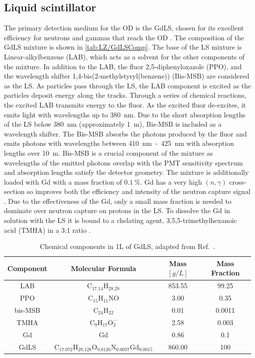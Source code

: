 \subsection{Liquid scintillator}\label{sec:LZ/LS}
The primary detection medium for the OD is the GdLS, chosen for its excellent efficiency for neutrons and gammas that reach the OD \cite{LZTDR}. The composition of the GdLS mixture is shown in \autoref{tab:LZ/GdLSComp}. The base of the LS mixture is Linear-alkylbenzene (LAB), which acts as a solvent for the other components of the mixture. In addition to the LAB, the fluor 2,5-diphenyloxazole (PPO), and the wavelength shifter 1,4-bis(2-methylstyryl(benzene)) (Bis-MSB) are considered as the LS. As particles pass through the LS, the LAB component is excited as the particles deposit energy along the tracks. Through a series of chemical reactions, the excited LAB transmits energy to the fluor. As the excited fluor de-excites, it emits light with wavelengths up to 380~nm. Due to the short absorption lengths of the LS below 380~nm (approximately 1~m), Bis-MSB is included as a wavelength shifter. The Bis-MSB absorbs the photons produced by the fluor and emits photons with wavelengths between 410~nm~-~425~nm with absorption lengths over 10~m. Bis-MSB is a crucial component of the mixture as wavelengths of the emitted photons overlap with the PMT sensitivity spectrum and absorption lengths satisfy the detector geometry.
The mixture is additionally loaded with Gd with a mass fraction of $0.1~\%$. Gd has a very high $(n,\gamma)$ cross-section so improves both the efficiency and intensity of the neutron capture signal \cite{LZTDR}. Due to the effectiveness of the Gd, only a small mass fraction is needed to dominate over neutron capture on protons in the LS. To dissolve the Gd in solution with the LS it is bound to a chelating agent, 3,5,5-trimethylhexanoic acid (TMHA) in a 3:1 ratio \cite{LZTDR,Haselschwardt:2018vmp}.
\begin{table}[!ht]
    \centering
    \begin{tabular}{cccc}
        \hline
        \textbf{Component} & \textbf{Molecular Formula} & \textbf{Mass $[g/L]$} & \textbf{Mass Fraction} \\
        \hline
        LAB & $\text{C}_{17.14}\text{H}_{28.28}$ & 853.55 & 99.25\\
        PPO & $\text{C}_{15}\text{H}_{11}\text{NO}$ & 3.00 & 0.35 \\
        bis-MSB & $\text{C}_{24}\text{H}_{22}$ & 0.01 & 0.0011\\
        TMHA & $\text{C}_{9}\text{H}_{17}\text{O}_{2}^{-}$ & 2.58 & 0.003\\
        Gd & Gd & 0.86 & 0.1 \\
        \hline
        GdLS & $\text{C}_{17.072} \text{H}_{28.128} \text{O}_{0.0126} \text{N}_{0.0037} \text{Gd}_{0.0015}$ & 860.00 & 100 \\
        \hline
    \end{tabular}
    \caption{Chemical components in 1L of GdLS, adapted from Ref.~\cite{Haselschwardt:2018vmp}.}
    \label{tab:LZ/GdLSComp}
\end{table}
